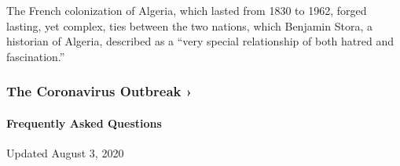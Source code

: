 The French colonization of Algeria, which lasted from 1830 to 1962,
forged lasting, yet complex, ties between the two nations, which
Benjamin Stora, a historian of Algeria, described as a ``very special
relationship of both hatred and fascination.''

\href{https://www.nytimes3xbfgragh.onion/news-event/coronavirus?action=click\&pgtype=Article\&state=default\&region=MAIN_CONTENT_3\&context=storylines_faq}{}

\hypertarget{the-coronavirus-outbreak-}{%
\subsubsection{The Coronavirus Outbreak
›}\label{the-coronavirus-outbreak-}}

\hypertarget{frequently-asked-questions}{%
\paragraph{Frequently Asked
Questions}\label{frequently-asked-questions}}

Updated August 3, 2020

